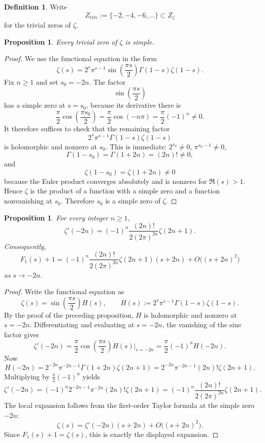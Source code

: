 \documentclass[11pt,a4paper]{article}
\newtheorem{proposition}[theorem]{Proposition}
\theoremstyle{definition}
\newtheorem{definition}[theorem]{Definition}
\theoremstyle{remark}
\begin{document}
\begin{definition}
Write
\[
Z_{\mathrm{triv}}:=\{-2,-4,-6,\dots\}\subset Z_\zeta
\]
for the trivial zeros of \(\zeta\).
\end{definition}

\begin{proposition}
Every trivial zero of \(\zeta\) is simple.
\end{proposition}

\begin{proof}
We use the functional equation in the form
\[
\zeta(s)=2^s\pi^{s-1}\sin\left(\frac{\pi s}{2}\right)\Gamma(1-s)\zeta(1-s).
\]
Fix \(n\ge1\) and set \(s_0=-2n\). The factor
\[
\sin\left(\frac{\pi s}{2}\right)
\]
has a simple zero at \(s=s_0\), because its derivative there is
\[
\frac{\pi}{2}\cos\left(\frac{\pi s_0}{2}\right)
=\frac{\pi}{2}\cos(-n\pi)=\frac{\pi}{2}(-1)^n\ne0.
\]
It therefore suffices to check that the remaining factor
\[
2^s\pi^{s-1}\Gamma(1-s)\zeta(1-s)
\]
is holomorphic and nonzero at \(s_0\). This is immediate: \(2^{s_0}\ne0\), \(\pi^{s_0-1}\ne0\),
\[
\Gamma(1-s_0)=\Gamma(1+2n)=(2n)!\ne0,
\]
and
\[
\zeta(1-s_0)=\zeta(1+2n)\ne0
\]
because the Euler product converges absolutely and is nonzero for \(\Re(s)>1\).
Hence \(\zeta\) is the product of a function with a simple zero and a function nonvanishing at \(s_0\). Therefore \(s_0\) is a simple zero of \(\zeta\).
\end{proof}

\begin{proposition}
For every integer \(n\ge1\),
\[
\zeta'(-2n)=(-1)^n\frac{(2n)!}{2(2\pi)^{2n}}\zeta(2n+1).
\]
Consequently,
\[
F_1(s)+1
=(-1)^n\frac{(2n)!}{2(2\pi)^{2n}}\zeta(2n+1)(s+2n)+O\bigl((s+2n)^2\bigr)
\]
as \(s\to-2n\).
\end{proposition}

\begin{proof}
Write the functional equation as
\[
\zeta(s)=\sin\left(\frac{\pi s}{2}\right)H(s),
\qquad
H(s):=2^s\pi^{s-1}\Gamma(1-s)\zeta(1-s).
\]
By the proof of the preceding proposition, \(H\) is holomorphic and nonzero at \(s=-2n\). Differentiating and evaluating at \(s=-2n\), the vanishing of the sine factor gives
\[
\zeta'(-2n)=\frac{\pi}{2}\cos\left(\frac{\pi s}{2}\right)H(s)\bigg|_{s=-2n}
=\frac{\pi}{2}(-1)^nH(-2n).
\]
Now
\[
H(-2n)=2^{-2n}\pi^{-2n-1}\Gamma(1+2n)\zeta(2n+1)
=2^{-2n}\pi^{-2n-1}(2n)!\zeta(2n+1).
\]
Multiplying by \(\frac{\pi}{2}(-1)^n\) yields
\[
\zeta'(-2n)
=(-1)^n2^{-2n-1}\pi^{-2n}(2n)!\zeta(2n+1)
=(-1)^n\frac{(2n)!}{2(2\pi)^{2n}}\zeta(2n+1).
\]
The local expansion follows from the first-order Taylor formula at the simple zero \(-2n\):
\[
\zeta(s)=\zeta'(-2n)(s+2n)+O\bigl((s+2n)^2\bigr).
\]
Since \(F_1(s)+1=\zeta(s)\), this is exactly the displayed expansion.
\end{proof}
\end{document}
